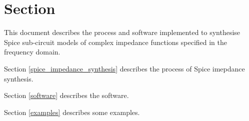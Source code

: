 \section{Section}\label{introduction}


This document describes the process and software implemented to synthesise Spice sub-circuit models of complex impedance functions specified in the frequency domain.

Section \ref{spice_impedance_synthesis} describes the process of Spice imepdance synthesis.

Section \ref{software} describes the software.

Section \ref{examples} describes some examples.


